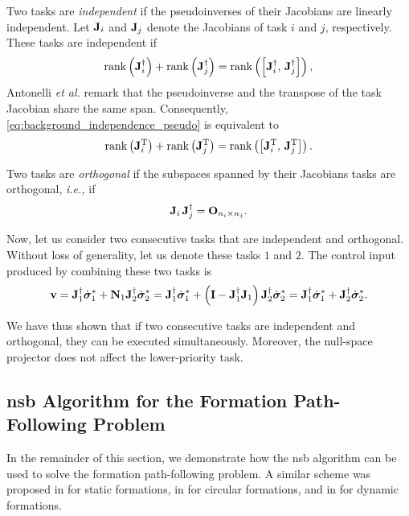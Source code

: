 Two tasks are \emph{independent} if the pseudoinverses of their Jacobians are linearly independent.
Let $\mathbf{J}_i$ and $\mathbf{J}_j$ denote the Jacobians of task $i$ and $j$, respectively.
These tasks are independent if
\begin{equation}
    {\operatorname*{rank}} \left(\mathbf{J}_i^{\dagger}\right) + {\operatorname*{rank}} \left(\mathbf{J}_j^{\dagger}\right) = {\rm rank} \left(\left[ \mathbf{J}_i^{\dagger},\, \mathbf{J}_j^{\dagger} \right]\right),
    \label{eq:background_independence_pseudo}
\end{equation}
Antonelli \emph{et al.} \cite{antonelli_stability_2008} remark that the pseudoinverse and the transpose of the task Jacobian share the same span.
Consequently, \eqref{eq:background_independence_pseudo} is equivalent to
\begin{equation}
    {\operatorname*{rank}} \left(\mathbf{J}_i^{\mathrm{T}}\right) + {\operatorname*{rank}} \left(\mathbf{J}_j^{\mathrm{T}}\right) = {\rm rank} \left(\left[ \mathbf{J}_i^{\mathrm{T}},\, \mathbf{J}_j^{\mathrm{T}} \right]\right).
    \label{eq:background_independence}
\end{equation}

Two tasks are \emph{orthogonal} if the subspaces spanned by their Jacobians tasks are orthogonal, \emph{i.e.,} if
\begin{equation}
    \mathbf{J}_i \, \mathbf{J}_j^{\dagger} = \mathbf{O}_{n_i \times n_j}.
\end{equation}

Now, let us consider two consecutive tasks that are independent and orthogonal. 
Without loss of generality, let us denote these tasks $1$ and $2$.
The control input produced by combining these two tasks is
\begin{equation}
    \mathbf{v} = \mathbf{J}_1^{\dagger} \dot{\bm{\sigma}}_1^{*} + \mathbf{N}_1 \mathbf{J}_2^{\dagger} \dot{\bm{\sigma}}_2^{*}
    = \mathbf{J}_1^{\dagger} \dot{\bm{\sigma}}_1^{*} + \left(\mathbf{I} - \mathbf{J}_1^{\dagger}\mathbf{J}_1\right) \mathbf{J}_2^{\dagger} \dot{\bm{\sigma}}_2^{*}
    = \mathbf{J}_1^{\dagger} \dot{\bm{\sigma}}_1^{*} + \mathbf{J}_2^{\dagger} \dot{\bm{\sigma}}_2^{*}.
\end{equation}

We have thus shown that if two consecutive tasks are independent and orthogonal, they can be executed simultaneously.
Moreover, the null-space projector does not affect the lower-priority task.

\subsection{\gls{nsb} Algorithm for the Formation Path-Following Problem}
\label{sec:background_nsb_formation_path_following}
In the remainder of this section, we demonstrate how the \gls{nsb} algorithm can be used to solve the formation path-following problem.
A similar scheme was proposed in \cite{arrichiello_formation_2006} for static formations, in \cite{antonelli_2006_kinematic,antonelli_stability_2008} for circular formations, and in \cite{eek_formation_2021} for dynamic formations.

